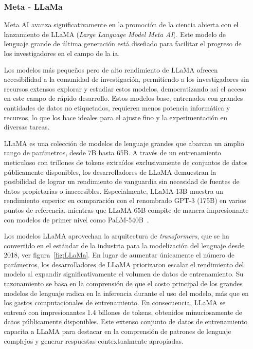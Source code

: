 \subsubsection{Meta - LLaMa}

Meta AI avanza significativamente en la promoción de la ciencia abierta con el lanzamiento de LLaMA (\textit{Large Language Model Meta AI}). Este modelo de lenguaje grande de última generación está diseñado para facilitar el progreso de los investigadores en el campo de la \acrshort{ia}.

Los modelos más pequeños pero de alto rendimiento de LLaMA ofrecen accesibilidad a la comunidad de investigación, permitiendo a los investigadores sin recursos extensos explorar y estudiar estos modelos, democratizando así el acceso en este campo de rápido desarrollo. Estos modelos base, entrenados con grandes cantidades de datos no etiquetados, requieren menos potencia informática y recursos, lo que los hace ideales para el ajuste fino y la experimentación en diversas tareas.

LLaMA es una colección de modelos de lenguaje grandes que abarcan un amplio rango de parámetros, desde 7B hasta 65B. A través de un entrenamiento meticuloso con trillones de tokens extraídos exclusivamente de conjuntos de datos públicamente disponibles, los desarrolladores de LLaMA demuestran la posibilidad de lograr un rendimiento de vanguardia sin necesidad de fuentes de datos propietarias o inaccesibles. Especialmente, LLaMA-13B muestra un rendimiento superior en comparación con el renombrado GPT-3 (175B) en varios puntos de referencia, mientras que LLaMA-65B compite de manera impresionante con modelos de primer nivel como PaLM-540B~\cite{Murtuza}.


Los modelos LLaMA aprovechan la arquitectura de \textit{transformers}, que se ha convertido en el estándar de la industria para la modelización del lenguaje desde 2018, ver figura~\ref{fig:LLaMa}. En lugar de aumentar únicamente el número de parámetros, los desarrolladores de LLaMA priorizaron escalar el rendimiento del modelo al expandir significativamente el volumen de datos de entrenamiento. Su razonamiento se basa en la comprensión de que el costo principal de los grandes modelos de lenguaje radica en la inferencia durante el uso del modelo, más que en los gastos computacionales de entrenamiento. En consecuencia, LLaMA se entrenó con impresionantes 1.4 billones de tokens, obtenidos minuciosamente de datos públicamente disponibles. Este extenso conjunto de datos de entrenamiento capacita a LLaMA para destacar en la comprensión de patrones de lenguaje complejos y generar respuestas contextualmente apropiadas.

